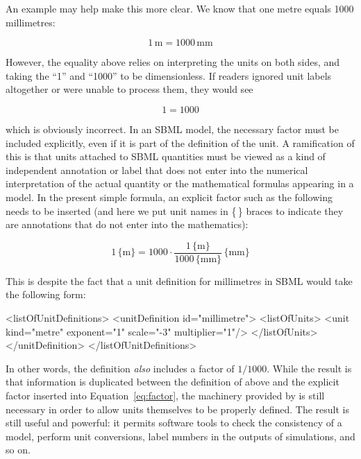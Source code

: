 An example may help make this more clear.  We know that one metre
equals 1000 millimetres:
\begin{linenomath}
  \begin{equation*}
    1\, \mathrm{m} = 1000\, \mathrm{mm}
  \end{equation*}
\end{linenomath}
However, the equality above relies on interpreting the units on
both sides, and taking the ``1'' and ``1000'' to be dimensionless.
If readers ignored unit labels altogether or were unable to
process them, they would see
\begin{linenomath}
  \begin{equation*}
    1 = 1000
  \end{equation*}
\end{linenomath}
which is obviously incorrect.  In an SBML model, the necessary
factor must be included explicitly, even if it is part of the
definition of the unit.  A ramification of this is that units
attached to SBML quantities must be viewed as a kind of
independent annotation or label that does not enter into the
numerical interpretation of the actual quantity or the
mathematical formulas appearing in a model.  In the present simple
formula, an explicit factor such as the following needs to be
inserted (and here we put unit names in \{$\,$\} braces to
indicate they are annotations that do not enter into the
mathematics):
\begin{linenomath}
  \begin{equation}\label{eq:factor}
    1 \, \{\mathrm{m}\} = 1000 \cdot \frac{1 \, \{\mathrm{m}\}}{1000 \, \{\mathrm{mm}\}} \, \{\mathrm{mm}\}
  \end{equation}
\end{linenomath}
This is despite the fact that a unit definition for millimetres in SBML
would take the following form:
\begin{example}
<listOfUnitDefinitions>
    <unitDefinition id="millimetre">
        <listOfUnits>
            <unit kind="metre" exponent="1" scale="-3" multiplier="1"/>
        </listOfUnits>
    </unitDefinition>
</listOfUnitDefinitions>
\end{example}

In other words, the definition \emph{also} includes a factor of
$1/1000$.  While the result is that information is duplicated
between the definition of  above and the
explicit factor inserted into Equation~\ref{eq:factor}, the
machinery provided by \UnitDefinition is still necessary in order
to allow units themselves to be properly defined.  The result is
still useful and powerful: it permits software tools to check the
consistency of a model, perform unit conversions, label numbers in
the outputs of simulations, and so on.

